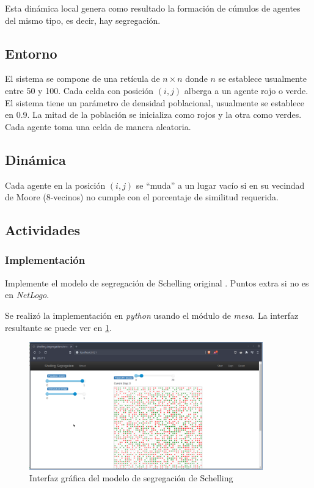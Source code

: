 \documentclass{article}
\begin{document}
Esta dinámica local genera como resultado la formación de cúmulos de agentes del
mismo tipo, es decir, hay segregación.

\subsection{Entorno}

El sistema se compone de una retícula de $n \times n$ donde $n$ se establece
usualmente entre 50 y 100. Cada celda con posición $(i,j)$ alberga a un agente
rojo o verde.
El sistema tiene un parámetro de densidad poblacional, usualmente se establece
en 0.9. La mitad de la población se inicializa como rojos y la otra como verdes.
Cada agente toma una celda de manera aleatoria.

\subsection{Dinámica}
Cada agente en la posición $(i,j)$ se “muda” a un lugar vacío si en su vecindad
de Moore (8-vecinos) no cumple con el porcentaje de similitud requerida.

\subsection{Actividades}

\subsubsection{Implementación}

Implemente el modelo de segregación de Schelling original \cite{Schelling_1971}.
Puntos extra si no es en \textit{NetLogo}.

Se realizó la implementación en \textit{python} usando el módulo de
\textit{mesa}. La interfaz resultante se puede ver en \ref{fig:sch-ui}.

\begin{figure}
  \centering
  \includegraphics[width=0.9\textwidth]{imgs/shelling-ui.png}
  \caption{Interfaz gráfica del modelo de segregación de Schelling}
  \label{fig:sch-ui}
\end{figure}
\end{document}
